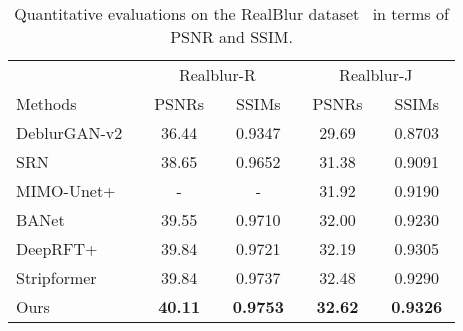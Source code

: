 \documentclass[10pt,twocolumn,letterpaper]{article}
\begin{document}
\begin{table}[!t]\footnotesize
\centering
    \caption{Quantitative evaluations on the RealBlur
    dataset~\cite{Realblur} in terms of PSNR and SSIM.}
    \label{tab:Realblur}
    \vspace{-2mm}
    \begin{tabular}{lcccc}
        \toprule
                & \multicolumn{2}{c}{Realblur-R} &   \multicolumn{2}{c}{Realblur-J}                    \\
        Methods                         & ~PSNRs~  &  ~SSIMs~ & ~PSNRs~ & ~SSIMs~ \\
        \midrule
        DeblurGAN-v2~\cite{DeblurGANv2} & 36.44 & 0.9347 & 29.69 & 0.8703 \\
        SRN~\cite{SRN}                  & 38.65 & 0.9652 & 31.38 & 0.9091 \\
        MIMO-Unet+~\cite{MIMO}          &   -   &   -    & 31.92 & 0.9190 \\
        BANet~\cite{BANet}              & 39.55 & 0.9710 & 32.00 & 0.9230 \\
        DeepRFT+~\cite{Deeprft}         & 39.84 & 0.9721 & 32.19 & 0.9305 \\
        Stripformer~\cite{Stripformer}  & 39.84 & 0.9737 & 32.48 & 0.9290 \\
        Ours                    &\textbf{40.11} &\textbf{0.9753} &\textbf{32.62} &\textbf{0.9326 }\\
        \bottomrule
    \end{tabular}
   \vspace{-5mm}
\end{table}
\end{document}
